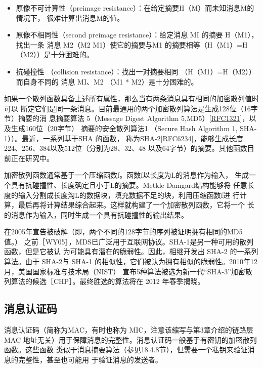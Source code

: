 \begin{itemize}
    \item 原像不可计算性（preimage resistance）：在给定摘要H（M）而未知消息M的情况下，
    很难计算出消息M的值。
    \item 原像不相同性（second preimage resistance）：给定消息 MI 的摘要 H（M1），找出一条
    消息 M2（M2 M1）使它的摘要与M1 的摘要相等（H（M1）=H（M2））是十分困难的。
    \item 抗碰撞性 （collision resistance）：找出一对摘要相同 （H（M1）=H（M2））而自身不同的
    消息 MI、M2 （M1 * M2）是十分困难的。
\end{itemize}

如果一个散列函数具备上述所有属性，那么当有两条消息具有相同的加密散列值时可以
断定它们是同一条消息。目前最通用的两个加密散列算法是生成128位（16字节）摘要的消
息摘要算法 5（Message Digest Algorithm 5,MD5）\href{https://www.rfc-editor.org/rfc/rfc1321}{[RFC1321]}，以及生成160位（20字节）
摘要的安全散列算法1 （Secure Hash Algorithm 1, SHA-1））。最近，一系列基于SHA 的函数，
称为SHA-2\href{https://www.rfc-editor.org/rfc/rfc6234}{[RFC6234]}，能够生成长度224、256、384以及512位（分别为28、32、48
以及64字节）的摘要。其他函数目前正在研究中。

\begin{tcolorbox}
    加密散列函数通常基于一个压缩函数f。函数f以长度为L的消息作为输入，
    生成一个具有抗碰撞性、长度确定且小于L的摘要。Metkle-Damgard结构能够将
    任意长度的输入分割成长度沟L的数据块，填充数据不足的块，利用压缩函数f进
    行计算，最后再将计算结果综合起来。这样就构建了一个加密散列函数，它将一个
    长的消息作为输入，同时生成一个具有抗碰撞性的输出结果。
\end{tcolorbox}

在2005年宣告被破解（即，两个不同的128字节的序列被证明拥有相同的MD5值。）
之前［WY05］，MDS已广泛用于互联网协议。SHA-1是另一种可用的散列函数，但是它被认
为可能具有潜在的脆弱性。因此，相继开发出 SHA-2 的一系列算法。由于 SHA-2与 SHA-1
的相似性，它们被认为拥有相似的脆弱性。2010年12月，美国国家标准与技术局（NIST）
宣布5种算法被选为新一代“SHA-3”加密散列算法的候选［CHP］。最终胜选的算法将在
2012 年春季揭晓。

\subsection{消息认证码}
消息认证码（简称为MAC，有时也称为 MIC，注意该缩写与第3章介绍的链路层 MAC
地址无关）用于保障消息的完整性。消息认证码一般基于有密钥的加密散列函数。这些函数
类似于消息摘要算法（参见18.4.8节），但需要一个私钥来验证消息的完整性，甚至也可能用
于验证消息的发送者。


